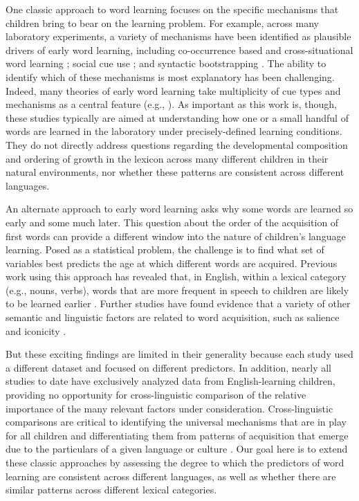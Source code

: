 \documentclass[manuscript]{stjour}
\begin{document}
One classic approach to word learning focuses on the specific mechanisms
that children bring to bear on the learning problem. For example, across
many laboratory experiments, a variety of mechanisms have been
identified as plausible drivers of early word learning, including
co-occurrence based and cross-situational word learning
\citep{schwartz1983,yu2007}; social cue use \citep{baldwin1993}; and
syntactic bootstrapping \citep{gleitman1990,mintz2003}. The ability to
identify which of these mechanisms is most explanatory has been
challenging. Indeed, many theories of early word learning take
multiplicity of cue types and mechanisms as a central feature (e.g.,
\citealp{hollich2000,bloom2000}). As important as this work is, though,
these studies typically are aimed at understanding how one or a small
handful of words are learned in the laboratory under precisely-defined
learning conditions. They do not directly address questions regarding
the developmental composition and ordering of growth in the lexicon
across many different children in their natural environments, nor
whether these patterns are consistent across different languages.

An alternate approach to early word learning asks why some words are
learned so early and some much later. This question about the order of
the acquisition of first words can provide a different window into the
nature of children's language learning. Posed as a statistical problem,
the challenge is to find what set of variables best predicts the age at
which different words are acquired. Previous work using this approach
has revealed that, in English, within a lexical category (e.g., nouns,
verbs), words that are more frequent in speech to children are likely to
be learned earlier \citep{goodman2008}. Further studies have found
evidence that a variety of other semantic and linguistic factors are
related to word acquisition, such as salience and iconicity
\citep{hills2009,stokes2010,perry2015,roy2015,swingley2017}.

But these exciting findings are limited in their generality because each
study used a different dataset and focused on different predictors. In
addition, nearly all studies to date have exclusively analyzed data from
English-learning children, providing no opportunity for cross-linguistic
comparison of the relative importance of the many relevant factors under
consideration. Cross-linguistic comparisons are critical to identifying
the universal mechanisms that are in play for all children and
differentiating them from patterns of acquisition that emerge due to the
particulars of a given language or culture \citep{slobin1985,bates1987}.
Our goal here is to extend these classic approaches by assessing the
degree to which the predictors of word learning are consistent across
different languages, as well as whether there are similar patterns
across different lexical categories.
\end{document}
